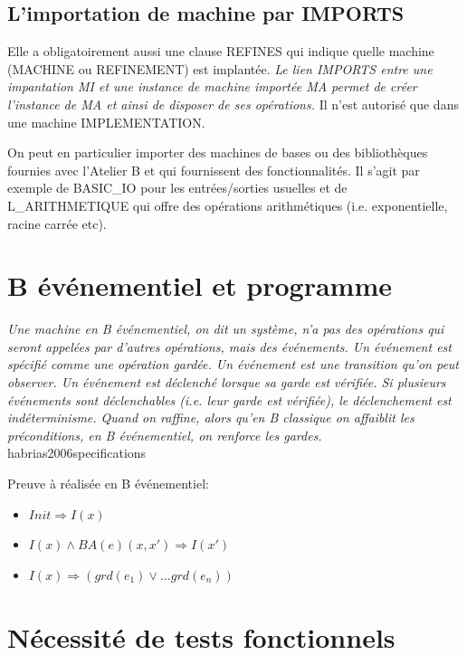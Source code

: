 \documentclass[10pt,a4paper]{article}
\begin{document}
\subsection{L'importation de machine par IMPORTS}

Elle a obligatoirement aussi une clause REFINES qui indique quelle machine (MACHINE
ou REFINEMENT) est implantée. \emph{Le lien IMPORTS entre une impantation MI et une instance de machine importée MA permet de créer l’instance de MA et ainsi de disposer de ses opérations.\cite{habrias2006specifications}}
Il n'est autorisé que dans une machine IMPLEMENTATION.

On peut en particulier importer des machines de bases ou des bibliothèques fournies avec l’Atelier B et qui fournissent des fonctionnalités. Il s'agit par exemple de BASIC\_IO pour les entrées/sorties usuelles et de L\_ARITHMETIQUE qui offre des opérations arithmétiques (i.e. exponentielle, racine carrée etc).

\section{B événementiel et programme}

\emph{Une machine en B  événementiel, on dit un système, n’a pas des opérations qui seront appelées par d’autres opérations, mais des  événements. Un  événement est spécifié comme une opération gardée. Un événement  est une transition qu’on peut observer.\newline
\indent Un  événement est déclenché lorsque sa garde est vérifiée. Si plusieurs événements sont déclenchables (i.e. leur garde est vérifiée), le déclenchement est indéterminisme. \newline
\indent Quand on raffine, alors qu’en B classique on affaiblit les préconditions, en B événementiel, on renforce les gardes. 
}habrias2006specifications

Preuve à réalisée en B événementiel:
\begin{itemize}
\item $Init \Rightarrow I(x)$
\item $ I(x) \wedge BA(e)(x, x') \Rightarrow I(x')$
\item $ I(x) \Rightarrow \left( grd(e_1) \vee \ldots grd(e_n) \right)$
\end{itemize}



\section{Nécessité de tests fonctionnels}
\end{document}
